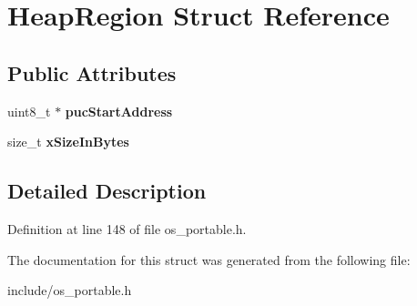 \hypertarget{structHeapRegion}{}\section{Heap\+Region Struct Reference}
\label{structHeapRegion}
\subsection*{Public Attributes}
\begin{DoxyCompactItemize}
\item 
\mbox{\label{structHeapRegion_aab323508c34642ebfb884a68441d97fc}} 
uint8\+\_\+t $\ast$ {\bfseries puc\+Start\+Address}
\item 
\mbox{\label{structHeapRegion_a5933b0fd422e70a92ceef839b89a757f}} 
size\+\_\+t {\bfseries x\+Size\+In\+Bytes}
\end{DoxyCompactItemize}


\subsection{Detailed Description}


Definition at line 148 of file os\+\_\+portable.\+h.



The documentation for this struct was generated from the following file\+:\begin{DoxyCompactItemize}
\item 
include/os\+\_\+portable.\+h\end{DoxyCompactItemize}
